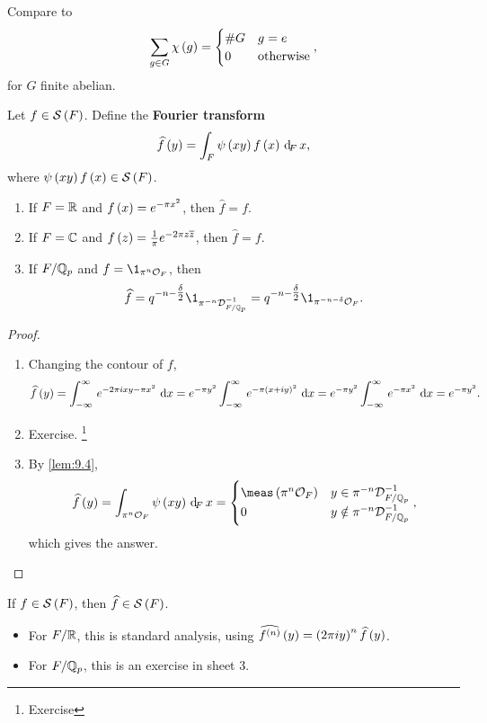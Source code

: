 Compare to
$$ \sum_{g \in G} \chi\br{g} =
\begin{cases}
\#G & g = e \\
0 & \text{otherwise}
\end{cases},
$$
for $ G $ finite abelian.

\begin{definition*}
Let $ f \in \SSS\br{F} $. Define the \textbf{Fourier transform}
$$ \widehat{f}\br{y} = \intF{\psi\br{xy}f\br{x}}{x}, $$
where $ \psi\br{xy}f\br{x} \in \SSS\br{F} $.
\end{definition*}

\pagebreak

\begin{proposition}
\label{prop:9.5}
\hfill
\begin{enumerate}
\item If $ F = \mathbb{R} $ and $ f\br{x} = e^{-\pi x^2} $, then $ \widehat{f} = f $.
\item If $ F = \mathbb{C} $ and $ f\br{z} = \tfrac{1}{\pi}e^{-2\pi z\overline{z}} $, then $ \widehat{f} = f $.
\item If $ F / \mathbb{Q}_p $ and $ f = \1_{\pi^n\OOO_F} $, then
$$ \widehat{f} = q^{-n - \tfrac{\delta}{2}}\1_{\pi^{-n}\DDD_{F / \QQ_p}^{-1}} = q^{-n - \tfrac{\delta}{2}}\1_{\pi^{-n - \delta}\OOO_F}. $$
\end{enumerate}
\end{proposition}

\begin{proof}
\hfill
\begin{enumerate}
\item Changing the contour of $ f $,
$$ \widehat{f}\br{y} = \intd{-\infty}{\infty}{e^{-2\pi ixy - \pi x^2}}{x} = e^{-\pi y^2}\intd{-\infty}{\infty}{e^{-\pi\br{x + iy}^2}}{x} = e^{-\pi y^2}\intd{-\infty}{\infty}{e^{-\pi x^2}}{x} = e^{-\pi y^2}. $$
\item Exercise. \footnote{Exercise}
\item By \ref{lem:9.4},
$$ \widehat{f}\br{y} = \intF[\pi^n\OOO_F]{\psi\br{xy}}{x} =
\begin{cases}
\meas\br{\pi^n\OOO_F} & y \in \pi^{-n}\DDD_{F / \QQ_p}^{-1} \\
0 & y \notin \pi^{-n}\DDD_{F / \QQ_p}^{-1}
\end{cases},
$$
which gives the answer.
\end{enumerate}
\end{proof}

\begin{fact*}
If $ f \in \SSS\br{F} $, then $ \widehat{f} \in \SSS\br{F} $.
\begin{itemize}
\item For $ F / \mathbb{R} $, this is standard analysis, using $ \widehat{f^{\br{n}}}\br{y} = \br{2\pi iy}^n\widehat{f}\br{y} $.
\item For $ F / \mathbb{Q}_p $, this is an exercise in sheet $ 3 $.
\end{itemize}
\end{fact*}

